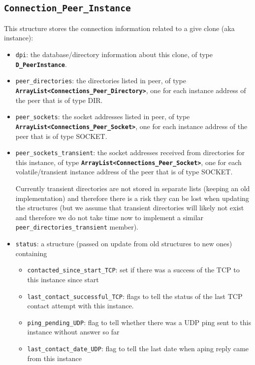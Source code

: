 \documentclass{book}
\newcommand{\cls}[1]{{\tt\bf #1}}
\newcommand{\mmb}[1]{{\tt #1}}
\begin{document}
\subsection{\cls{Connection\_Peer\_Instance}}
This structure stores the connection information related to a give clone (aka instance):
\begin{itemize}
\item
\mmb{dpi}: the database/directory information about this clone, of type \cls{D\_PeerInstance}.
\item
\mmb{peer\_directories}: the  directories listed in peer, of type \cls{ArrayList<Connections\_Peer\_Directory>}, one for each
instance address of the peer that is of type DIR.
\item
\mmb{peer\_sockets}: the socket addresses listed in peer, of type \cls{ArrayList<Connections\_Peer\_Socket>}, one for each
instance address of the peer that is of type SOCKET.
\item
\mmb{peer\_sockets\_transient}: the socket addresses received from directories for this instance, of type \cls{ArrayList<Connections\_Peer\_Socket>}, one for each volatile/transient
instance address of the peer that is of type SOCKET. 

Currently transient directories are not stored in separate lists (keeping an old implementation) and therefore 
there is a risk they can be lost when updating the structures (but we assume that transient directories will likely not exist and therefore
we do not take time now to implement a similar \mmb{peer\_directories\_transient} member).
\item
\mmb{status}: a structure (passed on update from old structures to new ones)  containing
 \begin{itemize}
 \item
	\mmb{contacted\_since\_start\_TCP}: set if there was a success of the TCP to this instance since start
 \item
	 \mmb{last\_contact\_successful\_TCP}:
            flags to tell the status of the last TCP contact attempt with this instance.
 \item
 	\mmb{ping\_pending\_UDP}: flag to tell whether there was a UDP ping sent to this instance without answer so far
 \item
	\mmb{last\_contact\_date\_UDP}: flag to tell the last date when aping reply came from this instance
 \end{itemize}
\end{itemize}
\end{document}
